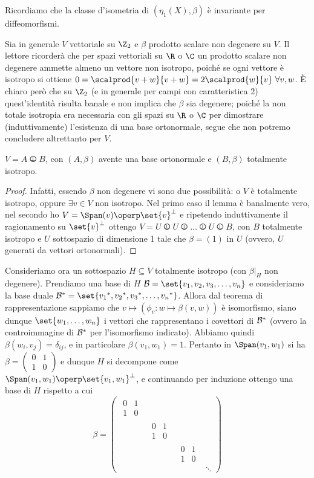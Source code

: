 
Ricordiamo che la classe d'isometria di $(\eta_1(X), \beta)$ è invariante per diffeomorfismi.

Sia in generale $V$ vettoriale su $\Z_2$ e $\beta$ prodotto scalare non degenere su $V$. Il lettore ricorderà che per spazi vettoriali su $\R$ o $\C$ un prodotto scalare non degenere ammette almeno un vettore non isotropo, poiché se ogni vettore è isotropo si ottiene $0 = \scalprod{v+w}{v+w} = 2\scalprod{w}{v} \ \forall v,w$. È chiaro però che su $\Z_2$ (e in generale per campi con caratteristica 2) quest'identità risulta banale e non implica che $\beta$ sia degenere; poiché la non totale isotropia era necessaria con gli spazi su $\R$ o $\C$ per dimostrare (induttivamente) l'esistenza di una base ortonormale, segue che non potremo concludere altrettanto per $V$.

\begin{lemma}[Lemma 1]
	$V = A \operp B$, con $(A, \beta)$ avente una base ortonormale e $(B, \beta)$ totalmente isotropo.
\end{lemma}
\begin{proof}
	Infatti, essendo $\beta$ non degenere vi sono due possibilità: o $V$ è totalmente isotropo, oppure $\exists v \in V$ non isotropo. Nel primo caso il lemma è banalmente vero, nel secondo ho $V = \Span(v) \operp \set{v}^\perp$ e ripetendo induttivamente il ragionamento su $\set{v}^\perp$ ottengo $V = U \operp U \operp \dots \operp U \operp B$, con $B$ totalmente isotropo e $U$ sottospazio di dimensione 1 tale che $\beta = (1)$ in $U$ (ovvero, $U$ generati da vettori ortonormali).
\end{proof}

Consideriamo ora un sottospazio $H \subseteq V$ totalmente isotropo (con $\beta|_H$ non degenere). Prendiamo una base di $H$ $\base = \set{v_1, v_2, v_3, \dots, v_n}$ e consideriamo la base duale $\base\dual = \set{v_1\dual, v_2\dual, v_3\dual, \dots, v_n\dual}$. Allora dal teorema di rappresentazione sappiamo che 
$v \mapsto (\phi_v : w \mapsto \beta(v,w))$ è isomorfismo, siano dunque $\set{w_1, \dots, w_n}$ i vettori che rappresentano i covettori di $\mathcal{B}{^\ast}$ (ovvero la controimmagine di $\mathcal{B}{^\ast}$ per l'isomorfismo indicato). Abbiamo quindi $\beta(w_i, v_j) = \delta_{ij}$, e in particolare $\beta(v_1, w_1) = 1$. Pertanto in $\Span(v_1, w_1)$ si ha $\beta = \left(\begin{smallmatrix} 0 & 1 \\ 1 & 0 \end{smallmatrix}\right)$ e dunque $H$ si decompone come $\Span(v_1, w_1) \operp \set{v_1, w_1}^\perp$, e continuando per induzione ottengo una base di $H$ rispetto a cui \[
\newcommand*\ROTIDMAT{\begin{matrix}0 & 1 \\ 1 & 0\end{matrix}}
\beta =
\begin{pmatrix}
	\ROTIDMAT \\
	& \ROTIDMAT \\
	& & \ROTIDMAT \\
	& & & \ddots
\end{pmatrix}
\]

